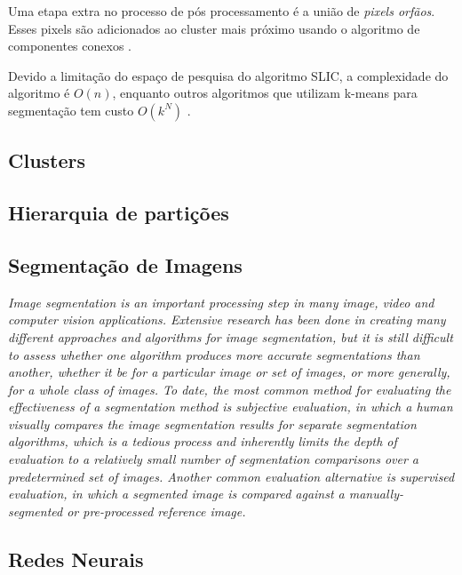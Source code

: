 \begin{document}
Uma etapa extra no processo de pós processamento é a união de \textit{pixels orfãos}. Esses pixels são adicionados ao cluster mais próximo usando o algoritmo de componentes conexos \cite{SLIC}.

Devido a limitação do espaço de pesquisa do algoritmo SLIC, a complexidade do algoritmo é $O(n)$, enquanto outros algoritmos que utilizam k-means para segmentação tem custo $O(k^N)$ \cite{SLIC}.

\subsection{Clusters} \label{sssec:clusters}

\subsection{Hierarquia de partições} \label{sssec:hierarchy}

\subsection{Segmentação de Imagens} \label{ssec:segmentacao}

\textit{Image segmentation is an important processing step in many image, video and computer vision applications. Extensive research has been done in creating many different approaches and algorithms for image segmentation, but it is still difficult to assess whether one algorithm produces more accurate segmentations than another, whether it be for a particular image or set of images, or more generally, for a whole class of images. To date, the most common method for evaluating the effectiveness of a segmentation method is subjective evaluation, in which a human visually compares the image segmentation results for separate segmentation algorithms, which is a tedious process and inherently limits the depth of evaluation to a relatively small number of segmentation comparisons over a predetermined set of images. Another common evaluation alternative is supervised evaluation, in which a segmented image is compared against a manually-segmented or pre-processed reference image.}

\subsection{Redes Neurais} \label{ssec:redes_neurais}


\end{document}
